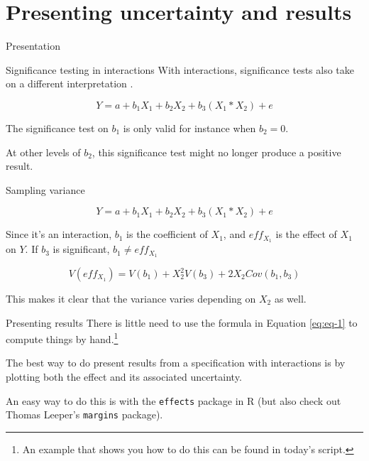 \documentclass[12pt,english,pdf,xcolor=dvipsnames,aspectratio=169,handout]{beamer}\usepackage[]{graphicx}\usepackage[]{xcolor}
\begin{document}
\section{Presenting uncertainty and results}


\begin{frame}
\begin{center}
    \Huge Presentation
\end{center}
\end{frame}


\begin{frame}{Significance testing in interactions}
With interactions, significance tests also take on a different interpretation \cite{braumoeller2004}.\bigskip

\begin{equation}
Y = a + b_1X_1 + b_2X_2 + b_3(X_1*X_2) + e
\end{equation}

The significance test on $b_1$ is only valid for instance when $b_2=0$.\bigskip

At other levels of $b_2$, this significance test might no longer produce a positive result.

\end{frame}


\begin{frame}{Sampling variance}

\begin{equation}
Y = a + b_1X_1 + b_2X_2 + b_3(X_1*X_2) + e
\end{equation}\bigskip

Since it's an interaction, $b_1$ is the coefficient of $X_1$, and $eff_{X_1}$ is the effect of $X_1$ on $Y$. If $b_3$ is significant, $b_1 \neq eff_{X_1}$\bigskip

\begin{equation}
V(eff_{X_1}) = V(b_1) + X_2^2V(b_3) + 2X_2Cov(b_1,b_3)
\label{eq:eq-1}
\end{equation}

This makes it clear that the variance varies depending on $X_2$ as well.

\end{frame}



\begin{frame}{Presenting results}
There is little need to use the formula in Equation \ref{eq:eq-1} to compute things by hand.\footnote{An example that shows you how to do this can be found in today's script.}\bigskip

The best way to do present results from a specification with interactions is by plotting both the effect and its associated uncertainty.\bigskip

An easy way to do this is with the \texttt{effects} package in R (but also check out Thomas Leeper's \texttt{margins} package).

\end{frame}
\end{document}
